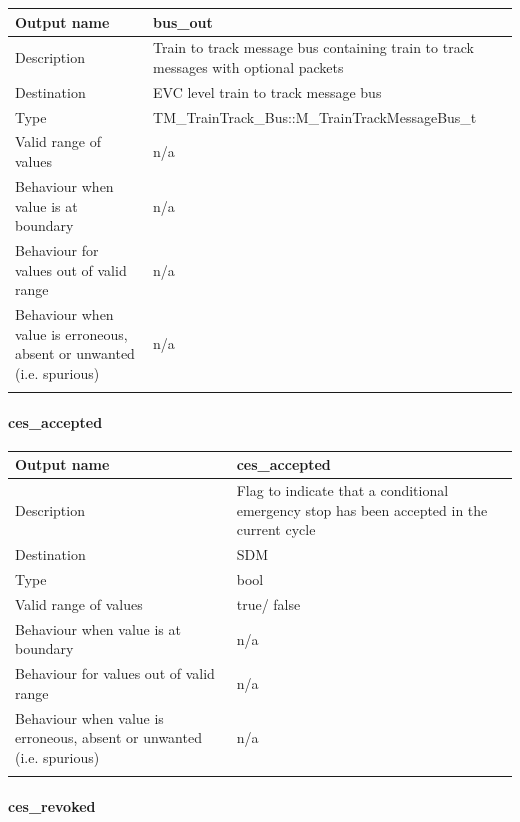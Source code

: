 \begin{longtable}{p{}p{}}
\toprule
Output name				& bus\_out \\
\midrule
Description				& Train to track message bus containing train to track messages with optional packets \\
\midrule
Destination				& EVC level train to track message bus  \\ 
\midrule
Type					& TM\_TrainTrack\_Bus::M\_TrainTrackMessageBus\_t\\


\midrule
Valid range of values	& n/a \\
\midrule
Behaviour when value is at boundary	& n/a  \\
\midrule
Behaviour for values out of valid range	& n/a  \\
\midrule
Behaviour when value is erroneous, absent or unwanted (i.e. spurious) & n/a  \\
\\
\bottomrule
\end{longtable}

\paragraph{ces\_accepted}

\begin{longtable}{p{}p{}}
\toprule
Output name				& ces\_accepted \\
\midrule
Description				& Flag to indicate that a conditional emergency stop has been accepted in the current cycle \\
\midrule
Destination				& SDM  \\ 
\midrule
Type					& bool\\


\midrule
Valid range of values	& true/ false \\
\midrule
Behaviour when value is at boundary	& n/a  \\
\midrule
Behaviour for values out of valid range	& n/a  \\
\midrule
Behaviour when value is erroneous, absent or unwanted (i.e. spurious) & n/a  \\
\\
\bottomrule
\end{longtable}

\paragraph{ces\_revoked}

